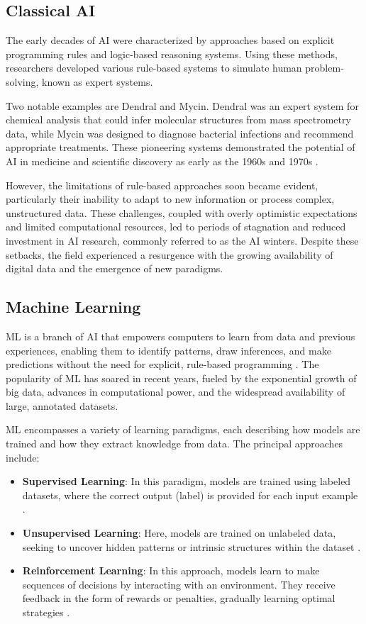 \documentclass[a4paper,10pt]{book}
\begin{document}
\subsection{Classical AI}

The early decades of AI were characterized by approaches based on explicit programming rules and logic-based reasoning systems. Using these methods, researchers developed various rule-based systems to simulate human problem-solving, known as expert systems.

Two notable examples are Dendral and Mycin. Dendral was an expert system for chemical analysis that could infer molecular structures from mass spectrometry data, while Mycin was designed to diagnose bacterial infections and recommend appropriate treatments. These pioneering systems demonstrated the potential of AI in medicine and scientific discovery as early as the 1960s and 1970s \cite{filipsson_evolution_2024}.

However, the limitations of rule-based approaches soon became evident, particularly their inability to adapt to new information or process complex, unstructured data. These challenges, coupled with overly optimistic expectations and limited computational resources, led to periods of stagnation and reduced investment in AI research, commonly referred to as the AI winters. Despite these setbacks, the field experienced a resurgence with the growing availability of digital data and the emergence of new paradigms. 

\subsection{Machine Learning}

ML is a branch of AI that empowers computers to learn from data and previous experiences, enabling them to identify patterns, draw inferences, and make predictions without the need for explicit, rule-based programming \cite{noauthor_what_nodate}. The popularity of ML has soared in recent years, fueled by the exponential growth of big data, advances in computational power, and the widespread availability of large, annotated datasets.

ML encompasses a variety of learning paradigms, each describing how models are trained and how they extract knowledge from data. The principal approaches include:

\begin{itemize}
\item \textbf{Supervised Learning}: In this paradigm, models are trained using labeled datasets, where the correct output (label) is provided for each input example \cite{jiang_supervised_2020}. 
\item \textbf{Unsupervised Learning}: Here, models are trained on unlabeled data, seeking to uncover hidden patterns or intrinsic structures within the dataset \cite{noauthor_unsupervised_nodate}. 
\item \textbf{Reinforcement Learning}: In this approach, models learn to make sequences of decisions by interacting with an environment. They receive feedback in the form of rewards or penalties, gradually learning optimal strategies \cite{ghasemi_introduction_2024}.
\end{itemize}
\end{document}
